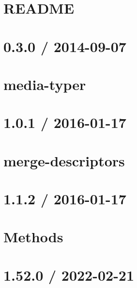 \documentclass[twoside]{book}
\newcommand{\+}{\discretionary{\mbox{\scriptsize$\hookleftarrow$}}{}{}}
\begin{document}
\chapter{README}
\label{md_Backend_nodejs_node_modules_mariadb_README}

\chapter{0.3.0 / 2014-\/09-\/07}
\label{md_Backend_nodejs_node_modules_media_typer_HISTORY}

\chapter{media-\/typer}
\label{md_Backend_nodejs_node_modules_media_typer_README}

\chapter{1.0.1 / 2016-\/01-\/17}
\label{md_Backend_nodejs_node_modules_merge_descriptors_HISTORY}

\chapter{merge-\/descriptors}
\label{md_Backend_nodejs_node_modules_merge_descriptors_README}

\chapter{1.1.2 / 2016-\/01-\/17}
\label{md_Backend_nodejs_node_modules_methods_HISTORY}

\chapter{Methods}
\label{md_Backend_nodejs_node_modules_methods_README}

\chapter{1.52.0 / 2022-\/02-\/21}
\label{md_Backend_nodejs_node_modules_mime_db_HISTORY}

\end{document}
